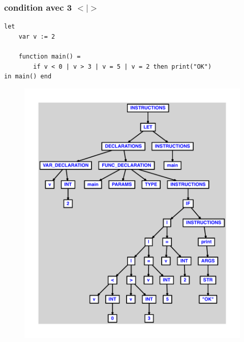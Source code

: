 \documentclass{article}
\begin{document}
\subsubsection{condition avec 3 $ < $$ | $$ > $}
\begin{lstlisting}
let
	var v := 2

	function main() =
		if v < 0 | v > 3 | v = 5 | v = 2 then print("OK")
in main() end
\end{lstlisting}
\newpage
\begin{figure}[H]
\centering
\includegraphics[max width=\textwidth]{ast/ast_284.pdf}
\end{figure}
\newpage
\end{document}
